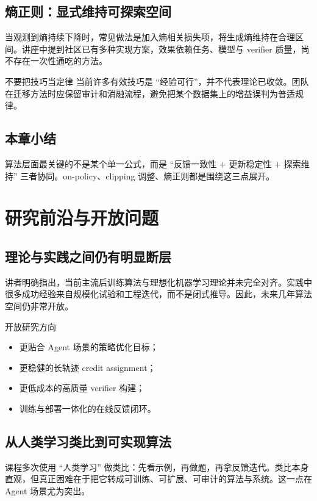 \documentclass[a4paper]{article}
\begin{document}
\subsection{熵正则：显式维持可探索空间}
当观测到熵持续下降时，常见做法是加入熵相关损失项，将生成熵维持在合理区间。讲座中提到社区已有多种实现方案，效果依赖任务、模型与 verifier 质量，尚不存在一次性通吃的方法。

\begin{warningbox}{不要把技巧当定律}
当前许多有效技巧是 ``经验可行''，并不代表理论已收敛。团队在迁移方法时应保留审计和消融流程，避免把某个数据集上的增益误判为普适规律。
\end{warningbox}

\subsection{本章小结}
算法层面最关键的不是某个单一公式，而是 ``反馈一致性 + 更新稳定性 + 探索维持'' 三者协同。on-policy、clipping 调整、熵正则都是围绕这三点展开。

\section{研究前沿与开放问题}

\subsection{理论与实践之间仍有明显断层}
讲者明确指出，当前主流后训练算法与理想化机器学习理论并未完全对齐。实践中很多成功经验来自规模化试验和工程迭代，而不是闭式推导。因此，未来几年算法空间仍非常开放。

\begin{importantbox}{开放研究方向}
\begin{itemize}
    \item 更贴合 Agent 场景的策略优化目标；
    \item 更稳健的长轨迹 credit assignment；
    \item 更低成本的高质量 verifier 构建；
    \item 训练与部署一体化的在线反馈闭环。
\end{itemize}
\end{importantbox}

\subsection{从人类学习类比到可实现算法}
课程多次使用 ``人类学习'' 做类比：先看示例，再做题，再拿反馈迭代。类比本身直观，但真正困难在于把它转成可训练、可扩展、可审计的算法与系统。这一点在 Agent 场景尤为突出。
\end{document}
